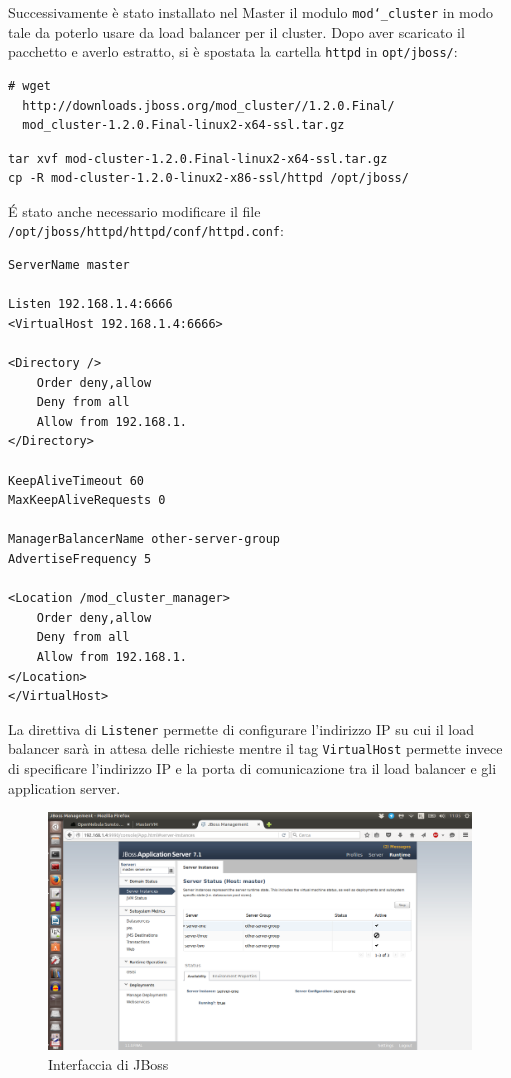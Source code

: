 \documentclass[twoside]{article}
\begin{document}
Successivamente è stato installato nel Master il modulo \texttt{mod\char`_cluster} in modo tale da poterlo
usare da load balancer per il cluster. Dopo aver scaricato il pacchetto e averlo estratto,
si è spostata la cartella \texttt{httpd} in \texttt{opt/jboss/}:
\begin{lstlisting}[frame=trBL]
# wget
  http://downloads.jboss.org/mod_cluster//1.2.0.Final/
  mod_cluster-1.2.0.Final-linux2-x64-ssl.tar.gz
\end{lstlisting}
\begin{lstlisting}[frame=trBL]
tar xvf mod-cluster-1.2.0.Final-linux2-x64-ssl.tar.gz
cp -R mod-cluster-1.2.0-linux2-x86-ssl/httpd /opt/jboss/
\end{lstlisting}
\'{E} stato anche necessario modificare il file \texttt{/opt/jboss/httpd/httpd/conf/httpd.conf}:
\newpage
\begin{lstlisting}[frame=trBL]
ServerName master

Listen 192.168.1.4:6666
<VirtualHost 192.168.1.4:6666>

<Directory />
	Order deny,allow
	Deny from all
	Allow from 192.168.1.
</Directory>

KeepAliveTimeout 60
MaxKeepAliveRequests 0

ManagerBalancerName other-server-group
AdvertiseFrequency 5

<Location /mod_cluster_manager>
	Order deny,allow
	Deny from all
	Allow from 192.168.1.
</Location>
</VirtualHost>
\end{lstlisting}
La direttiva di \texttt{Listener} permette di configurare l'indirizzo IP su cui il load balancer sarà
in attesa delle richieste mentre il tag \texttt{VirtualHost} permette invece di specificare l’indirizzo IP e
la porta di comunicazione tra il load balancer e gli application server.

\begin{figure}[!bp]
\centering
\includegraphics[width=13cm]{immagine1.png}
\caption{Interfaccia di JBoss}\label{fig:1}
\end{figure}
\end{document}
